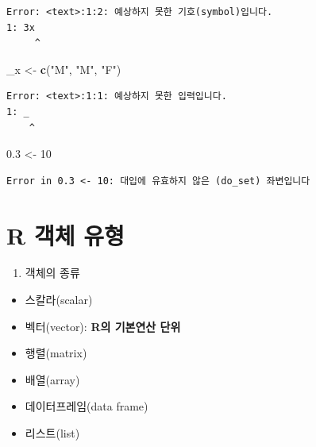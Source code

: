 \documentclass[11pt,a4paper]{book}
\newenvironment{Shaded}{\begin{snugshade}}{\end{snugshade}}
\newcommand{\KeywordTok}[1]{\textcolor[rgb]{0.13,0.29,0.53}{\textbf{#1}}}
\newcommand{\DecValTok}[1]{\textcolor[rgb]{0.00,0.00,0.81}{#1}}
\newcommand{\FloatTok}[1]{\textcolor[rgb]{0.00,0.00,0.81}{#1}}
\newcommand{\StringTok}[1]{\textcolor[rgb]{0.31,0.60,0.02}{#1}}
\newcommand{\NormalTok}[1]{#1}
\providecommand{\tightlist}{%
  \setlength{\itemsep}{0pt}\setlength{\parskip}{0pt}}
\theoremstyle{definition}
\theoremstyle{definition}
\theoremstyle{definition}
\theoremstyle{remark}
\begin{document}
\begin{verbatim}
Error: <text>:1:2: 예상하지 못한 기호(symbol)입니다.
1: 3x
     ^
\end{verbatim}

\normalsize

\footnotesize

\begin{Shaded}
\begin{Highlighting}[]
\NormalTok{_x <-}\StringTok{ }\KeywordTok{c}\NormalTok{(}\StringTok{"M"}\NormalTok{, }\StringTok{"M"}\NormalTok{, }\StringTok{"F"}\NormalTok{)}
\end{Highlighting}
\end{Shaded}

\begin{verbatim}
Error: <text>:1:1: 예상하지 못한 입력입니다.
1: _
    ^
\end{verbatim}

\normalsize

\footnotesize

\begin{Shaded}
\begin{Highlighting}[]
\FloatTok{0.3}\NormalTok{ <-}\StringTok{ }\DecValTok{10}
\end{Highlighting}
\end{Shaded}

\begin{verbatim}
Error in 0.3 <- 10: 대입에 유효하지 않은 (do_set) 좌변입니다
\end{verbatim}

\normalsize

\section{R 객체 유형}\label{r--}

\begin{enumerate}
\def\labelenumi{\arabic{enumi}.}
\tightlist
\item
  객체의 종류
\end{enumerate}

\begin{itemize}
\tightlist
\item
  스칼라(scalar)
\item
  벡터(vector): \textbf{R의 기본연산 단위}
\item
  행렬(matrix)
\item
  배열(array)
\item
  데이터프레임(data frame)
\item
  리스트(list)
\end{itemize}
\end{document}
